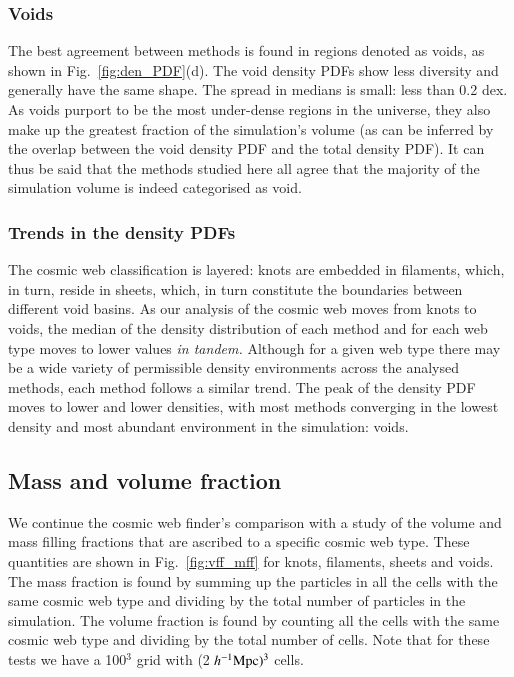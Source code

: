 \subsubsection{Voids}
The best agreement between methods is found in regions denoted as voids, as shown in Fig.~\ref{fig:den_PDF}(d). The void density PDFs show less diversity and generally have the same shape. The spread in medians is small: less than 0.2 dex. As voids purport to be the most under-dense regions in the universe, they also make up the greatest fraction of the simulation's volume (as can be inferred by the overlap between the void density PDF and the total density PDF). It can thus be said that the methods studied here all agree that the majority of the simulation volume is indeed categorised as void.

\subsubsection{Trends in the density PDFs}
The cosmic web classification is layered: knots are embedded in filaments, which, in turn, reside in sheets, which, in turn constitute the boundaries between different void basins. As our analysis of the cosmic web moves from knots to voids, the median of the density distribution of each method and for each web type moves to lower values {\it in tandem.} Although for a given web type there may be a wide variety of permissible density environments across the analysed methods, each method follows a similar trend. The peak of the density PDF moves to lower and lower densities, with most methods converging in the lowest density and most abundant environment in the simulation: voids.

\subsection{Mass and volume fraction}
We continue the cosmic web finder's comparison with a study of the volume and mass filling fractions that are ascribed to a specific cosmic web type. These quantities are shown in Fig.~\ref{fig:vff_mff} for knots, filaments, sheets and voids. The mass fraction is found by summing up the particles in all the cells with the same cosmic web type and dividing by the total number of particles in the simulation. The volume fraction is found by counting all the cells with the same cosmic web type and dividing by the total number of cells. Note that for these tests we have a 100$^3$ grid with (2$~h^{-1}\rm Mpc)^3$ cells.
 
